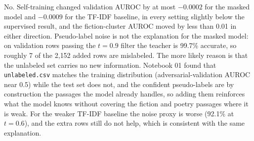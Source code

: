 No. Self-training changed validation AUROC by at most $-0.0002$ for the masked model and $-0.0009$ for the TF-IDF baseline, in every setting slightly below the supervised result, and the fiction-cluster AUROC moved by less than 0.01 in either direction. Pseudo-label noise is not the explanation for the masked model: on validation rows passing the $t=0.9$ filter the teacher is 99.7\% accurate, so roughly 7 of the 2{,}152 added rows are mislabeled. The more likely reason is that the unlabeled set carries no new information. Notebook 01 found that \texttt{unlabeled.csv} matches the training distribution (adversarial-validation AUROC near 0.5) while the test set does not, and the confident pseudo-labels are by construction the passages the model already handles, so adding them reinforces what the model knows without covering the fiction and poetry passages where it is weak. For the weaker TF-IDF baseline the noise proxy is worse (92.1\% at $t=0.6$), and the extra rows still do not help, which is consistent with the same explanation.
